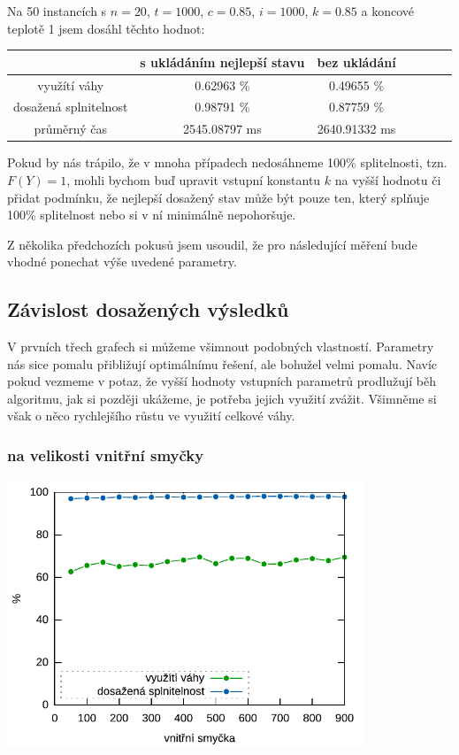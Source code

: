 \documentclass[a4paper,10pt]{article}
\begin{document}
Na 50 instancích s $n=20$, $t=1000$, $c=0.85$, $i=1000$, $k=0.85$ a koncové teplotě 1 jsem dosáhl těchto hodnot:

\renewcommand{\arraystretch}{1.15}
\begin{table}[htb]
 \centering
\begin{tabular}{ c || c | c | c | c | c | c}
  & \textbf{s ukládáním nejlepší stavu} & \textbf{bez ukládání} \\
  \hline
využítí váhy & 0.62963 \% & 0.49655 \% \\
dosažená splnitelnost & 0.98791 \% & 0.87759  \%\\
průměrný čas & 2545.08797 ms & 2640.91332 ms\\
\end{tabular}
\end{table}

Pokud by nás trápilo, že v mnoha případech nedosáhneme 100\% splitelnosti, tzn. $F(Y)=1$,
mohli bychom buď upravit vstupní konstantu $k$ na vyšší hodnotu či přidat podmínku,
že nejlepší dosažený stav může být pouze ten, který splňuje 100\% splitelnost nebo
si v ní minimálně nepohoršuje.

Z několika předchozích pokusů jsem usoudil, že pro následující měření bude vhodné ponechat výše uvedené parametry.

\subsection*{Závislost dosažených výsledků}

V prvních třech grafech si můžeme všimnout podobných vlastností. Parametry nás sice
pomalu přibližují optimálnímu řešení, ale bohužel velmi pomalu. Navíc pokud vezmeme v potaz,
že vyšší hodnoty vstupních parametrů prodlužují běh algoritmu, jak si později ukážeme,
je potřeba jejich využití zvážit. Všimněme si však o něco rychlejšího růstu ve využití celkové váhy.

\subsubsection*{na velikosti vnitřní smyčky}
\begin{center}
\includegraphics[width=0.8\textwidth]{inner_loop.pdf}
\end{center}
\end{document}
